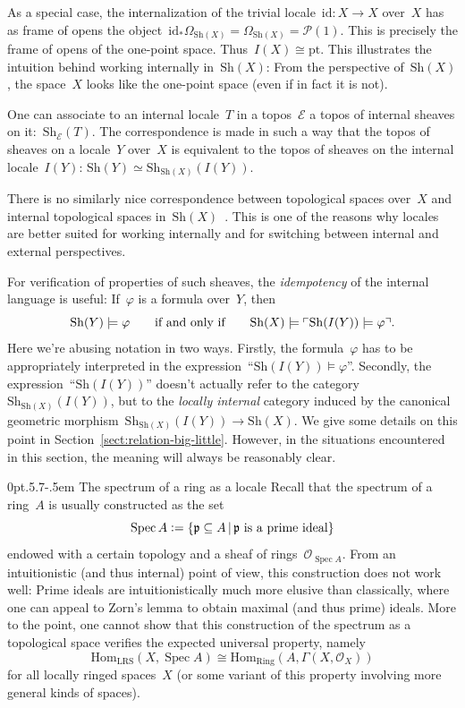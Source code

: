 \documentclass[10pt,reqno,a4paper]{amsbook}
\makeatletter
\theoremstyle{definition}
\theoremstyle{plain}
\theoremstyle{remark}
\newcommand{\E}{\mathcal{E}}
\renewcommand{\O}{\mathcal{O}}
\renewcommand{\P}{\mathcal{P}}
\newcommand{\ppp}{\mathfrak{p}}
\newcommand{\Hom}{\mathrm{Hom}}
\newcommand{\id}{\mathrm{id}}
\newcommand{\Sh}{\mathrm{Sh}}
\newcommand{\Ring}{\mathrm{Ring}}
\newcommand{\LRS}{\mathrm{LRS}}
\newcommand{\pt}{\mathrm{pt}}
\DeclareMathOperator{\Spec}{Spec}
\newcommand{\?}{\,{:}\,}
\renewcommand{\_}{\mathpunct{.}\,}
\newcommand{\speak}[1]{\ulcorner\text{\textnormal{#1}}\urcorner}
\newcommand{\defeq}{\vcentcolon=}
\def\subsection{\@startsection{subsection}{2}%
  {0pt}{.5\linespacing\@plus.7\linespacing}{-.5em}%
  {\normalfont\bfseries}}
\makeatother
\begin{document}
As a special case, the internalization of the trivial locale~$\id : X \to X$
over~$X$ has as frame of opens the object~$\id_* \Omega_{\Sh(X)} =
\Omega_{\Sh(X)} = \P(1)$. This is precisely the frame of opens of the
one-point space. Thus~$I(X) \cong \pt$. This illustrates the intuition
behind working internally in~$\Sh(X)$: From the perspective
of~$\Sh(X)$, the space~$X$ looks like the one-point space (even if in fact it
is not).

One can associate to an internal locale~$T$ in a topos~$\E$ a topos of internal
sheaves on it:~$\Sh_\E(T)$. The correspondence is made in such a way that the topos of
sheaves on a locale~$Y$ over~$X$ is equivalent to the topos of sheaves on the
internal locale~$I(Y)$: $\Sh(Y) \simeq \Sh_{\Sh(X)}(I(Y))$.

There is no similarly nice correspondence between topological spaces
over~$X$ and internal topological spaces
in~$\Sh(X)$~\cite[Corollary~C1.6.7]{johnstone:elephant}. This is one of the
reasons why locales are better suited for working internally and for switching
between internal and external perspectives.

For verification of properties of such sheaves, the \emph{idempotency} of the
internal language is useful: If~$\varphi$ is a formula over~$Y$, then
\[ \Sh(Y) \models \varphi \qquad\text{if and only if}\qquad
  \Sh(X) \models \speak{$\Sh(I(Y)) \models \varphi$}. \]
Here we're abusing notation in two ways. Firstly, the formula~$\varphi$ has to
be appropriately interpreted in the expression~``$\Sh(I(Y)) \models \varphi$''.
Secondly, the expression~``$\Sh(I(Y))$'' doesn't actually refer to the
category~$\Sh_{\Sh(X)}(I(Y))$, but to the \emph{locally internal} category induced by
the canonical geometric morphism~$\Sh_{\Sh(X)}(I(Y)) \to \Sh(X)$. We give some
details on this point in Section~\ref{sect:relation-big-little}. However, in
the situations encountered in this section, the meaning will always be
reasonably clear.


\subsection{The spectrum of a ring as a locale}
\label{sect:spectrum-as-a-locale}
Recall that the spectrum
of a ring~$A$ is usually constructed as the set
\[ \Spec A \defeq \{ \ppp \subseteq A \,|\,
  \text{$\ppp$ is a prime ideal} \} \]
endowed with a certain topology and a sheaf of rings~$\O_{\Spec A}$. From an
intuitionistic (and thus internal) point of view, this construction does not
work well: Prime ideals are intuitionistically much more elusive than
classically, where one can appeal to Zorn's lemma to obtain maximal (and thus
prime) ideals. More to the point, one cannot show that this construction of
the spectrum as a topological space verifies the expected universal property,
namely
\[ \Hom_\LRS(X, \Spec A) \cong \Hom_\Ring(A, \Gamma(X, \O_X)) \]
for all locally ringed spaces~$X$ (or some variant of this property involving
more general kinds of spaces).
\end{document}
